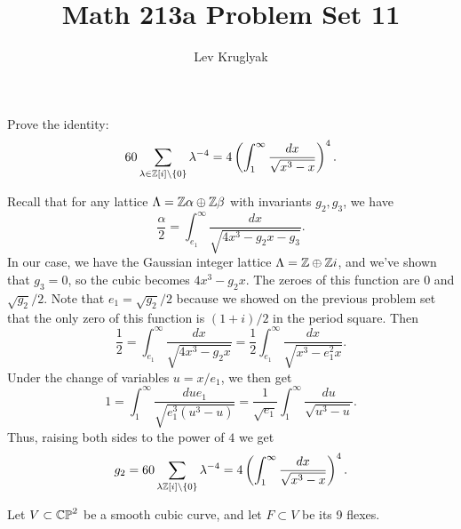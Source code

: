 \documentclass{pset}
\title{Math 213a Problem Set 11}
\author{Lev Kruglyak}
\begin{document}
\maketitle
\collaborators

\begin{problem}{5.7}
  Prove the identity:
  \[
    60\sum_{\lambda\in \mathbb{Z}[i]\setminus\{0\}} \lambda^{-4} = 4\left(\int_1^\infty \frac{dx}{\sqrt{x^3-x}}\right)^4.
  \]
\end{problem}

\begin{solution}
  Recall that for any lattice $\Lambda=\mathbb{Z}\alpha \oplus \mathbb{Z}\beta$ with invariants $g_2, g_3$, we have
  \[
    \frac{\alpha}{2} = \int_{e_1}^\infty\frac{dx}{\sqrt{4x^3-g_2x-g_3}}.
  \]
  In our case, we have the Gaussian integer lattice $\Lambda = \mathbb{Z} \oplus \mathbb{Z} i$, and we've shown that $g_3=0$, so the cubic becomes $4x^3-g_2x$. The zeroes of this function are $0$ and $\sqrt{g_2}/2$. Note that $e_1=\sqrt{g_2}/2$ because we showed on the previous problem set that the only zero of this function is $(1+i)/2$ in the period square. Then
  \[
    \frac{1}{2} = \int_{e_1}^\infty \frac{dx}{\sqrt{4x^3-g_2 x}} = \frac{1}{2}\int_{e_1}^\infty\frac{dx}{\sqrt{x^3-e_1^2 x}}.
  \]
  Under the change of variables $u=x/e_1$, we then get
  \[
    1 = \int_1^\infty \frac{du e_1}{\sqrt{e_1^3(u^3-u)}} = \frac{1}{\sqrt{e_1}}\int_1^\infty \frac{du}{\sqrt{u^3-u}}.
  \]
  Thus, raising both sides to the power of $4$ we get
  \[
    g_2 = 60\sum_{\lambda \mathbb{Z}[i]\setminus \{0\}} \lambda^{-4} = 4\left(\int_1^\infty \frac{dx}{\sqrt{x^3-x}}\right)^4.
  \]
\end{solution}

\begin{problem}{5.11}
  Let $V\subset \mathbb{CP}^2$ be a smooth cubic curve, and let $F\subset V$ be its 9 flexes.
\end{problem}
\end{document}
